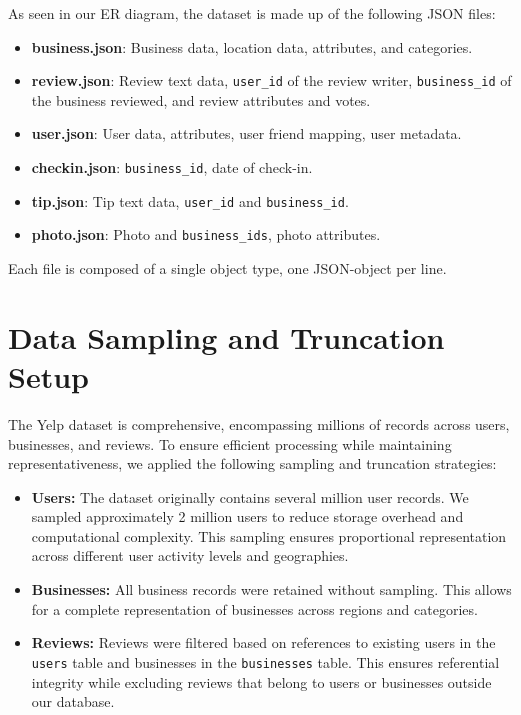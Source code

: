 \documentclass[12pt]{article}
\begin{document}
As seen in our ER diagram, the dataset is made up of the following JSON files:
\begin{itemize}
    \item \textbf{business.json}: Business data, location data, attributes, and categories.
    \item \textbf{review.json}: Review text data, \texttt{user\_id} of the review writer, \texttt{business\_id} of the business reviewed, and review attributes and votes.
    \item \textbf{user.json}: User data, attributes, user friend mapping, user metadata.
    \item \textbf{checkin.json}: \texttt{business\_id}, date of check-in.
    \item \textbf{tip.json}: Tip text data, \texttt{user\_id} and \texttt{business\_id}.
    \item \textbf{photo.json}: Photo and \texttt{business\_ids}, photo attributes.
\end{itemize}

Each file is composed of a single object type, one JSON-object per line.


\section{Data Sampling and Truncation Setup}

The Yelp dataset is comprehensive, encompassing millions of records across users, businesses, and reviews. To ensure efficient processing while maintaining representativeness, we applied the following sampling and truncation strategies:

\begin{itemize}
    \item \textbf{Users:} The dataset originally contains several million user records. We sampled approximately 2 million users to reduce storage overhead and computational complexity. This sampling ensures proportional representation across different user activity levels and geographies.
    \item \textbf{Businesses:} All business records were retained without sampling. This allows for a complete representation of businesses across regions and categories.
    \item \textbf{Reviews:} Reviews were filtered based on references to existing users in the \texttt{users} table and businesses in the \texttt{businesses} table. This ensures referential integrity while excluding reviews that belong to users or businesses outside our database.
\end{itemize}
\end{document}
